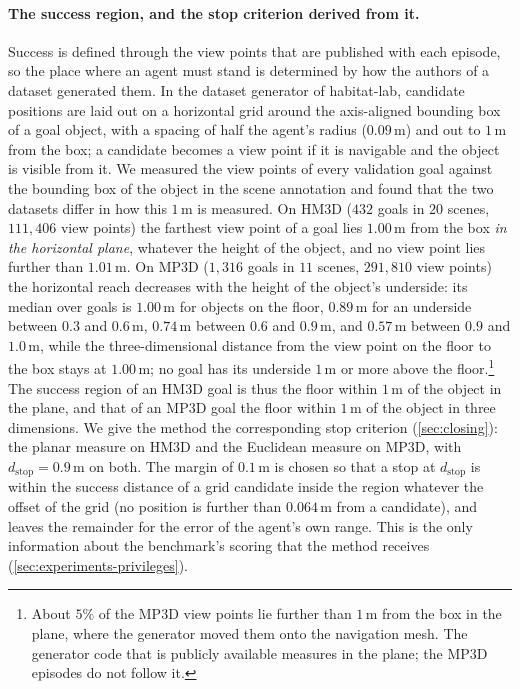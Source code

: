 \documentclass[10pt]{article}
\newcommand{\m}{\,\mathrm{m}}
\begin{document}
\paragraph{The success region, and the stop criterion derived from it.}
Success is defined through the view points that are published with each
episode, so the place where an agent must stand is determined by how the
authors of a dataset generated them. In the dataset generator of habitat-lab,
candidate positions are laid out on a horizontal grid around the axis-aligned
bounding box of a goal object, with a spacing of half the agent's radius
($0.09\m$) and out to $1\m$ from the box; a candidate becomes a view point if
it is navigable and the object is visible from it. We measured the view
points of every validation goal against the bounding box of the object in
the scene annotation and found that the two datasets differ in how this
$1\m$ is measured.
On HM3D ($432$ goals in $20$ scenes, $111{,}406$ view points) the farthest
view point of a goal lies $1.00\m$ from the box \emph{in the horizontal
plane}, whatever the height of the object, and no view point lies further
than $1.01\m$.
On MP3D ($1{,}316$ goals in $11$ scenes, $291{,}810$ view points) the
horizontal reach decreases with the height of the object's underside: its
median over goals is $1.00\m$ for objects on the floor, $0.89\m$ for an
underside between $0.3$ and $0.6\m$, $0.74\m$ between $0.6$ and $0.9\m$, and
$0.57\m$ between $0.9$ and $1.0\m$, while the three-dimensional distance from
the view point on the floor to the box stays at $1.00\m$; no goal has its
underside $1\m$ or more above the floor.\footnote{About $5\%$ of the MP3D view
points lie further than $1\m$ from the box in the plane, where the generator
moved them onto the navigation mesh. The generator code that is publicly
available measures in the plane; the MP3D episodes do not follow it.}
The success region of an HM3D goal is thus the floor within $1\m$ of the
object in the plane, and that of an MP3D goal the floor within $1\m$ of the
object in three dimensions. We give the method the corresponding stop criterion
(\cref{sec:closing}): the planar measure on HM3D and the Euclidean measure on
MP3D, with $d_{\mathrm{stop}}=0.9\m$ on both. The margin of $0.1\m$ is chosen
so that a stop at $d_{\mathrm{stop}}$ is within the success distance of a grid
candidate inside the region whatever the offset of the grid (no position is
further than $0.064\m$ from a candidate), and leaves the remainder for the
error of the agent's own range. This is the only information about the
benchmark's scoring that the method receives
(\cref{sec:experiments-privileges}).
\end{document}
